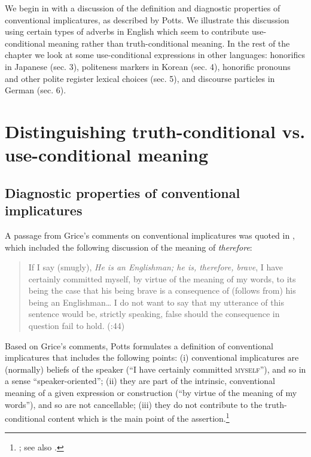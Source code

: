 We begin in  with a discussion of the definition and diagnostic properties of conventional implicatures, as described by Potts. We illustrate this discussion using certain types of adverbs in English which seem to contribute use-conditional meaning rather than truth-conditional meaning. In the rest of the chapter we look at some use-conditional expressions in other languages: honorifics in Japanese (sec. 3), politeness markers in Korean (sec. 4), honorific pronouns and other polite register lexical choices (sec. 5), and discourse particles in German (sec. 6).


\section{Distinguishing truth-conditional vs. use-conditional meaning}\label{sec:} %
\subsection{Diagnostic properties of conventional implicatures}\label{sec:} %

A passage from Grice’s comments on conventional implicatures was quoted in , which included the following discussion of the meaning of \textit{therefore}:


\begin{quote}
If I say (smugly), \textit{He is an Englishman; he is, therefore, brave}, I have certainly committed myself, by virtue of the meaning of my words, to its being the case that his being brave is a consequence of (follows from) his being an Englishman…  I do not want to say that my utterance of this sentence would be, strictly speaking, false should the consequence in question fail to hold.  (\citealt{Grice1975}:44)
\end{quote}


Based on Grice’s comments, Potts formulates a definition of conventional implicatures that includes the following points: (i) conventional implicatures are (normally) beliefs of the speaker (“I have certainly committed \textsc{myself}”), and so in a sense “speaker-oriented”; (ii) they are part of the intrinsic, conventional meaning of a given expression or construction (“by virtue of the meaning of my words”), and so are not cancellable; (iii) they do not contribute to the truth-conditional content which is the main point of the assertion.\footnote{\citet{Potts2005,Potts2012}; see also \citet[39]{Horn1997}.}



